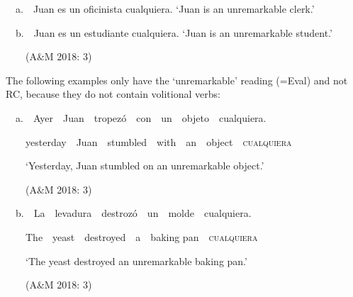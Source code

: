 \begin{styleStandard}
\ \ a.\ \ Juan es un oficinista cualquiera. ‘Juan is an unremarkable clerk.’
\end{styleStandard}

\begin{styleStandard}
\ \ b.\ \ Juan es un estudiante cualquiera. ‘Juan is an unremarkable student.’
\end{styleStandard}

\begin{styleStandard}
\ \ \ \ (A\&M 2018: 3)
\end{styleStandard}

\begin{styleStandard}
The following examples only have the ‘unremarkable’ reading (=Eval) and not RC, because they do not contain volitional verbs:
\end{styleStandard}

\begin{styleStandard}
\ \ a.\ \ Ayer\ \ Juan\ \ tropezó\ \ con\ \ un\ \ objeto\ \ cualquiera.
\end{styleStandard}

\begin{styleStandard}
\ \ \ \ yesterday\ \ Juan\ \ stumbled\ \ with\ \ an\ \ object\ \ \textsc{cualquiera}
\end{styleStandard}

\begin{styleStandard}
\ \ \ \ ‘Yesterday, Juan stumbled on an unremarkable object.’ 
\end{styleStandard}

\begin{styleStandard}
\ \ \ \ (A\&M 2018: 3)
\end{styleStandard}

\begin{styleStandard}
\ \ b.\ \ La\ \ levadura\ \ destrozó\ \ un\ \ molde\ \ cualquiera.
\end{styleStandard}

\begin{styleStandard}
\ \ \ \ The\ \ yeast\ \ destroyed\ \ a\ \ baking pan\ \ \textsc{cualquiera}
\end{styleStandard}

\begin{styleStandard}
\ \ \ \ ‘The yeast destroyed an unremarkable baking pan.’
\end{styleStandard}

\begin{styleStandard}
\ \ \ \ (A\&M 2018: 3)
\end{styleStandard}

